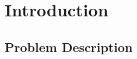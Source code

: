 \documentclass[../../main.tex]{subfiles}
\begin{document}
\chapter{Introduction}


\newpage
\section{Problem Description}
\end{document}
